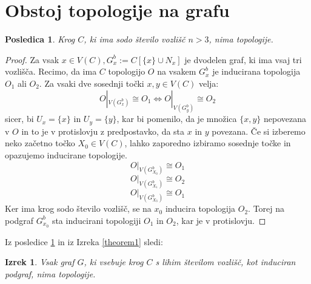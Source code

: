 \documentclass[a4paper, 12pt]{book}
\newtheorem{theorem}{Izrek}[section]
\newtheorem{corollary}{Posledica}[section]
\theoremstyle{definition}
\begin{document}
\section{Obstoj topologije na grafu}

\begin{corollary}\label{corollary1}
Krog $C$, ki ima sodo število vozlišč $n > 3$, nima topologije.
\end{corollary}
\begin{proof}
Za vsak $x \in V(C), G_x^b := C[\{x\} \cup N_x]$ je dvodelen graf, ki ima vsaj tri
vozlišča. Recimo, da ima $C$ topologijo $O$ na vsakem $G_x^b$ je inducirana 
topologija $O_1$ ali $O_2$. Za vsaki dve sosednji točki $x,y \in V(C)$ velja:
\[
    O|_{V(G_x^b)} \cong O_1 \iff O|_{V(G_y^b)} \cong O_2
\]
sicer, bi $U_x = \{x\}$ in $U_y = \{y\}$, kar bi pomenilo, da je množica
$\{x, y\}$ nepovezana v $O$ in to je v protislovju z predpostavko, da sta $x$ in
$y$ povezana. Če si izberemo neko začetno točko $X_0 \in V(C)$, lahko zaporedno
izbiramo sosednje točke in opazujemo inducirane topologije.
\[O|_{V(G_{X_0}^b)} \cong O_1\]
\[O|_{V(G_{X_1}^b)} \cong O_2\]
\[O|_{V(G_{X_3}^b)} \cong O_1\]
Ker ima krog sodo število vozlišč, se na $x_0$ inducira topologija $O_2$. Torej
na podgraf $G^b_{x_0}$ sta inducirani topologiji $O_1$ in $O_2$, kar je v protislovju.
\end{proof}

Iz posledice \ref*{corollary1} in iz Izreka \ref*{theorem1} sledi:
\begin{theorem}
Vsak graf $G$, ki vsebuje krog $C$ s lihim številom vozlišč, kot induciran podgraf,
nima topologije.
\end{theorem}

\nocite{*}
\cleardoublepage
{}


\end{document}

